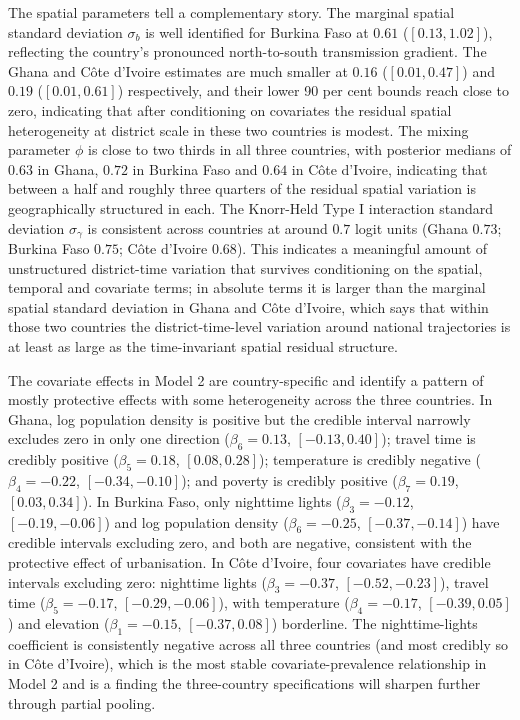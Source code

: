 \documentclass{article}
\begin{document}
The spatial parameters tell a complementary story. The marginal spatial
standard deviation \(\sigma_b\) is well identified for Burkina Faso at
\(0.61\) (\([0.13, 1.02]\)), reflecting the country's pronounced
north-to-south transmission gradient. The Ghana and Côte d'Ivoire
estimates are much smaller at \(0.16\) (\([0.01, 0.47]\)) and \(0.19\)
(\([0.01, 0.61]\)) respectively, and their lower 90 per cent bounds
reach close to zero, indicating that after conditioning on covariates
the residual spatial heterogeneity at district scale in these two
countries is modest. The mixing parameter \(\phi\) is close to two
thirds in all three countries, with posterior medians of \(0.63\) in
Ghana, \(0.72\) in Burkina Faso and \(0.64\) in Côte d'Ivoire,
indicating that between a half and roughly three quarters of the
residual spatial variation is geographically structured in each. The
Knorr-Held Type I interaction standard deviation \(\sigma_\gamma\) is
consistent across countries at around \(0.7\) logit units (Ghana
\(0.73\); Burkina Faso \(0.75\); Côte d'Ivoire \(0.68\)). This indicates
a meaningful amount of unstructured district-time variation that
survives conditioning on the spatial, temporal and covariate terms; in
absolute terms it is larger than the marginal spatial standard deviation
in Ghana and Côte d'Ivoire, which says that within those two countries
the district-time-level variation around national trajectories is at
least as large as the time-invariant spatial residual structure.

The covariate effects in Model 2 are country-specific and identify a
pattern of mostly protective effects with some heterogeneity across the
three countries. In Ghana, log population density is positive but the
credible interval narrowly excludes zero in only one direction
(\(\beta_6 = 0.13\), \([-0.13, 0.40]\)); travel time is credibly
positive (\(\beta_5 = 0.18\), \([0.08, 0.28]\)); temperature is credibly
negative (\(\beta_4 = -0.22\), \([-0.34, -0.10]\)); and poverty is
credibly positive (\(\beta_7 = 0.19\), \([0.03, 0.34]\)). In Burkina
Faso, only nighttime lights (\(\beta_3 = -0.12\), \([-0.19, -0.06]\))
and log population density (\(\beta_6 = -0.25\), \([-0.37, -0.14]\))
have credible intervals excluding zero, and both are negative,
consistent with the protective effect of urbanisation. In Côte d'Ivoire,
four covariates have credible intervals excluding zero: nighttime lights
(\(\beta_3 = -0.37\), \([-0.52, -0.23]\)), travel time
(\(\beta_5 = -0.17\), \([-0.29, -0.06]\)), with temperature
(\(\beta_4 = -0.17\), \([-0.39, 0.05]\)) and elevation
(\(\beta_1 = -0.15\), \([-0.37, 0.08]\)) borderline. The
nighttime-lights coefficient is consistently negative across all three
countries (and most credibly so in Côte d'Ivoire), which is the most
stable covariate-prevalence relationship in Model 2 and is a finding the
three-country specifications will sharpen further through partial
pooling.
\end{document}
